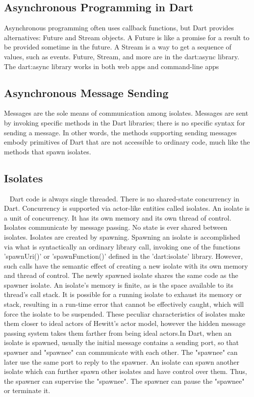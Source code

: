   \subsection{Asynchronous Programming in Dart}
  Asynchronous programming often uses callback functions, but Dart provides alternatives: Future and Stream objects. A Future is like a promise for a result to be provided sometime in the future. A Stream is a way to get a sequence of values, such as events. Future, Stream, and more are in the dart:async library.
  The dart:async library works in both web apps and command-line apps


  \subsection{Asynchronous Message Sending}
  Messages are the sole means of communication among isolates. Messages are sent by invoking specific methods in the Dart libraries; there is no specific syntax for sending a message.
  In other words, the methods supporting sending messages embody primitives of Dart that are not accessible to ordinary code, much like the methods that spawn isolates.
  \subsection{Isolates}~\parencite{dartEcma}
  \label{sec:isolates}
  Dart code is always single threaded. There is no shared-state concurrency in Dart. Concurrency is supported via actor-like entities called isolates.
  An isolate is a unit of concurrency. It has its own memory and its own thread of control. Isolates communicate by message passing. No state is ever shared between isolates. Isolates are created by spawning.
  Spawning an isolate is accomplished via what is syntactically an ordinary library call, invoking one of the functions 'spawnUri()' or 'spawnFunction()' defined in the 'dart:isolate' library. However, such calls have the semantic effect of creating a new isolate with its own memory and thread of control.
  The newly spawned isolate shares the same code as the spawner isolate. \cite{dartApiIsolate}
  An isolate’s memory is finite, as is the space available to its thread’s call stack. It is possible for a running isolate to exhaust its memory or stack, resulting in a run-time error that cannot be effectively caught, which will force the isolate to be suspended.
  These peculiar characteristics of isolates make them closer to ideal actors of Hewitt’s actor model, however the hidden message passing system takes them farther from being ideal actors.In Dart, when an isolate is spawned, usually the initial message contains a sending port, so that spawner and "spawnee" can communicate with each other. The "spawnee" can later use the same port to reply to the spawner. An isolate can spawn another isolate which can further spawn other isolates and have control over them. Thus, the spawner can supervise the "spawnee". The spawner can pause the "spawnee" or terminate it.

